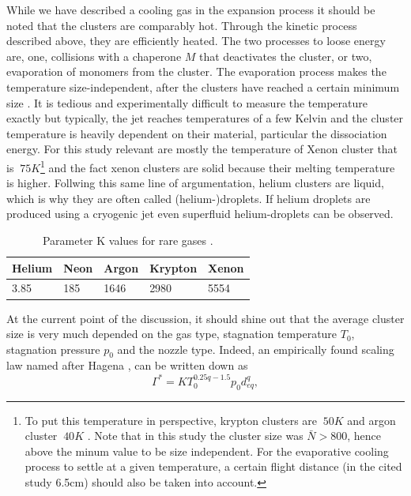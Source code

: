 While we have described a cooling gas in the expansion process it should be noted that the clusters are comparably hot. Through the kinetic process described above, they are efficiently heated. The two processes to loose energy are, one, collisions with a chaperone $M$ that deactivates the cluster, or two, evaporation of monomers from the cluster. The evaporation process makes the temperature size-independent, after the clusters have reached a certain minimum size \cite{Farges-1981-SurfSci}. It is tedious and experimentally difficult to measure the temperature exactly but typically, the jet reaches temperatures of a few Kelvin and the cluster temperature is heavily dependent on their material, particular the dissociation energy. For this study relevant are mostly the temperature of Xenon cluster that is $~75K$\footnote{To put this temperature in perspective, krypton clusters are $~50K$ and argon cluster $~40K$ \cite{Farges-1981-SurfSci,Gspann-1986-Springer}. Note that in this study the cluster size was $\bar{N} > 800$, hence above the minum value to be size independent. For the evaporative cooling process to settle at a given temperature, a certain flight distance (in the cited study 6.5cm) should also be taken into account.} and the fact xenon clusters are solid because their melting temperature is higher\cite{Gspann-1986-Springer}. Follwing this same line of argumentation, helium clusters are liquid, which is why they are often called (helium-)droplets. If helium droplets are produced using a cryogenic jet even superfluid helium-droplets can be observed.\\
\begin{table}
	\centering
		\begin{tabular}{ | l | l | l | l | l | }
			\hline
			Helium & Neon & Argon & Krypton & Xenon \\ \hline
			3.85 & 185 & 1646 & 2980 & 5554 \\ \hline
		\end{tabular}
	\caption{Parameter K values for rare gases \cite{TBD}.}
	\label{tab:k-parameter}
\end{table}
At the current point of the discussion, it should shine out that the average cluster size is very much depended on the gas type, stagnation temperature $T_{0}$, stagnation pressure $p_{0}$ and the nozzle type. Indeed, an empirically found scaling law named after Hagena \cite{TBD}, can be written down as
\begin{equation}
\Gamma^{*} = K T_{0}^{0.25q-1.5} p_{0} d_{eq}^{q},
\label{eq:Hagena-parameter}
\end{equation}
